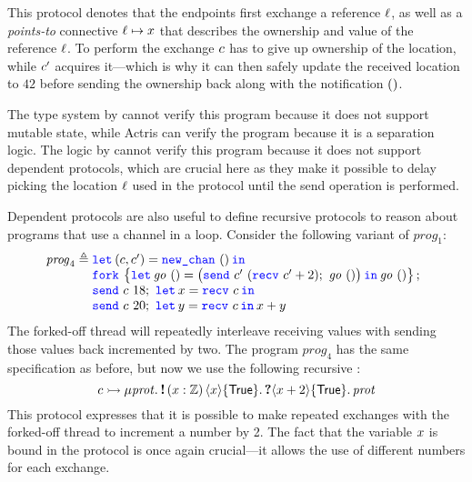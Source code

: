 \noindent
This protocol denotes that the endpoints first exchange a reference $\ell$, as well as a
\emph{points-to} connective $\ell\mapsto x$ that describes the ownership and
value of the reference $\ell$.
To perform the exchange $c$ has to give up ownership of the
location, while $c'$ acquires it---which is why it can then safely
update the received location to $42$ before sending the ownership back along with the
notification $()$.

The type system by \citet{bocchi-CONCUR2010} cannot verify this program because it does not support mutable state, while Actris can verify the program because it is a separation logic.
The logic by \citet{cracium-ICECCS2015} cannot verify this program because it does not support dependent protocols, which are crucial here as they make it possible to
delay picking the location $\ell$ used in the protocol until the send operation is performed.

Dependent protocols are also useful to define recursive protocols to reason about programs that use a channel in a loop.
Consider the following variant of ${\mathit prog}_1$:
\[
{\mathit {prog}_4}\eqdef
\begin{array}[t]{@{} l}
\Let {(\chan,\chan')} = \newchan in \\
\Fork{\Let {\mathit{go}\ \TT} =
  {\big(\send {\chan'} ({\recv {\chan'} + 2});\ \mathit{go}\ \TT\big)} in \mathit{go}\ \TT}; \\
\send \chan 18;\ \Let \var = {\recv \chan} in \\
\send \chan 20;\ \Let \varB = {\recv \chan} in \var + \varB
\end{array}
\]
%
The forked-off thread will repeatedly interleave receiving values with
sending those values back incremented by two.
The program ${\mathit prog}_4$ has the same specification as before, but now we use the following recursive \pnameSingular:
\[
\interp {\chan} {\MU \prot. \sendprot{(\var:\integer)}{\var}{\TRUE}
                            \recvprot{}{\var+2}{\TRUE} \prot}
\]
%
This protocol expresses that it is possible to make repeated exchanges with the forked-off thread to increment a number by 2.
The fact that the variable $x$ is bound in the protocol is once again crucial---it allows the use of different numbers for each exchange.

